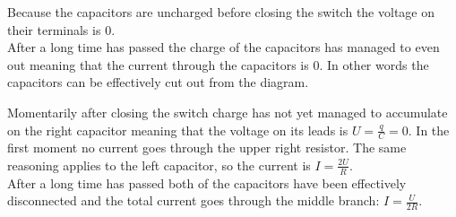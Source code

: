 {\ifEngHint
Because the capacitors are uncharged before closing the switch the voltage on their terminals is $0$.\\
After a long time has passed the charge of the capacitors has managed to even out meaning that the current through the capacitors is $0$. In other words the capacitors can be effectively cut out from the diagram.
\fi


\ifEngSolution
Momentarily after closing the switch charge has not yet managed to accumulate on the right capacitor meaning that the voltage on its leads is $U=\frac{q}{C}=0$. In the first moment no current goes through the upper right resistor. The same reasoning applies to the left capacitor, so the current is $I=\frac{2U}{R}$.\\
After a long time has passed both of the capacitors have been effectively disconnected and the total current goes through the middle branch: $I=\frac{U}{2R}$.
\fi
}